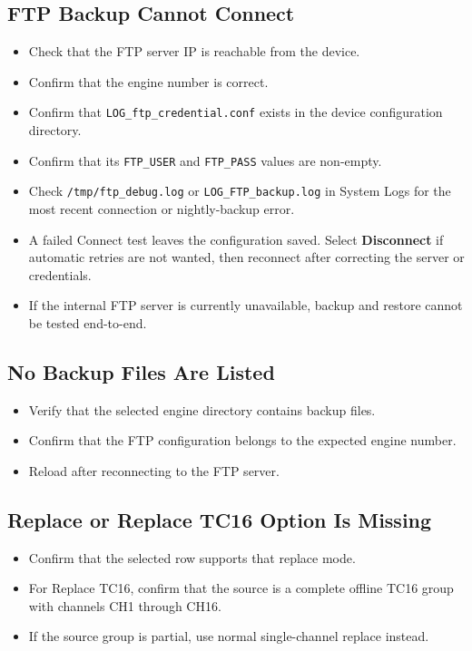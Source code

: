 \documentclass[11pt,a4paper]{article}
\begin{document}
\subsection{FTP Backup Cannot Connect}
\begin{itemize}
\item Check that the FTP server IP is reachable from the device.
\item Confirm that the engine number is correct.
\item Confirm that \texttt{LOG\_ftp\_credential.conf} exists in the device configuration directory.
\item Confirm that its \texttt{FTP\_USER} and \texttt{FTP\_PASS} values are non-empty.
\item Check \texttt{/tmp/ftp\_debug.log} or \texttt{LOG\_FTP\_backup.log} in System Logs for the most recent connection or nightly-backup error.
\item A failed Connect test leaves the configuration saved. Select \textbf{Disconnect} if automatic retries are not wanted, then reconnect after correcting the server or credentials.
\item If the internal FTP server is currently unavailable, backup and restore cannot be tested end-to-end.
\end{itemize}

\subsection{No Backup Files Are Listed}
\begin{itemize}
\item Verify that the selected engine directory contains backup files.
\item Confirm that the FTP configuration belongs to the expected engine number.
\item Reload after reconnecting to the FTP server.
\end{itemize}

\subsection{Replace or Replace TC16 Option Is Missing}
\begin{itemize}
\item Confirm that the selected row supports that replace mode.
\item For Replace TC16, confirm that the source is a complete offline TC16 group with channels CH1 through CH16.
\item If the source group is partial, use normal single-channel replace instead.
\end{itemize}
\end{document}
